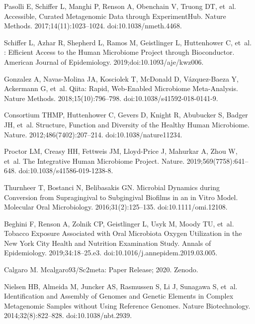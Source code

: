 \documentclass[10pt,letterpaper]{article}
\begin{document}
\begin{thebibliography}{10}
    Pasolli E, Schiffer L, Manghi P, Renson A, Obenchain V, Truong DT, et~al.
    \newblock Accessible, Curated Metagenomic Data through {{ExperimentHub}}.
    \newblock Nature Methods. 2017;14(11):1023--1024.
    \newblock doi:{10.1038/nmeth.4468}.
    
    Schiffer L, Azhar R, Shepherd L, Ramos M, Geistlinger L, Huttenhower C, et~al.
    : {{Efficient}} Access to the Human Microbiome Project
      through Bioconductor.
    \newblock American Journal of Epidemiology. 2019;doi:{10.1093/aje/kwz006}.
    
    Gonzalez A, {Navas-Molina} JA, Kosciolek T, McDonald D, {V{\'a}zquez-Baeza} Y,
      Ackermann G, et~al.
    \newblock Qiita: Rapid, Web-Enabled Microbiome Meta-Analysis.
    \newblock Nature Methods. 2018;15(10):796--798.
    \newblock doi:{10.1038/s41592-018-0141-9}.
    
    Consortium THMP, Huttenhower C, Gevers D, Knight R, Abubucker S, Badger JH,
      et~al.
    \newblock Structure, Function and Diversity of the Healthy Human Microbiome.
    \newblock Nature. 2012;486(7402):207--214.
    \newblock doi:{10.1038/nature11234}.
    
    Proctor LM, Creasy HH, Fettweis JM, {Lloyd-Price} J, Mahurkar A, Zhou W, et~al.
    \newblock The {{Integrative Human Microbiome Project}}.
    \newblock Nature. 2019;569(7758):641--648.
    \newblock doi:{10.1038/s41586-019-1238-8}.
    
    Thurnheer T, Bostanci N, Belibasakis GN.
    \newblock Microbial Dynamics during Conversion from Supragingival to
      Subgingival Biofilms in an in Vitro Model.
    \newblock Molecular Oral Microbiology. 2016;31(2):125--135.
    \newblock doi:{10.1111/omi.12108}.
    
    Beghini F, Renson A, Zolnik CP, Geistlinger L, Usyk M, Moody TU, et~al.
    \newblock Tobacco Exposure Associated with Oral Microbiota Oxygen Utilization
      in the {{New York City Health}} and {{Nutrition Examination Study}}.
    \newblock Annals of Epidemiology. 2019;34:18--25.e3.
    \newblock doi:{10.1016/j.annepidem.2019.03.005}.
    
    Calgaro M. Mcalgaro93/Sc2meta: {{Paper Release}}; 2020.
    \newblock Zenodo.
    
    Nielsen HB, Almeida M, Juncker AS, Rasmussen S, Li J, Sunagawa S, et~al.
    \newblock Identification and Assembly of Genomes and Genetic Elements in
      Complex Metagenomic Samples without Using Reference Genomes.
    \newblock Nature Biotechnology. 2014;32(8):822--828.
    \newblock doi:{10.1038/nbt.2939}.
    

\end{thebibliography}
\end{document}
